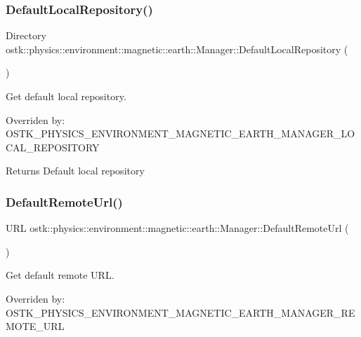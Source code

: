 \subsubsection{\texorpdfstring{Default\+Local\+Repository()}{DefaultLocalRepository()}}
{\footnotesize\ttfamily Directory ostk\+::physics\+::environment\+::magnetic\+::earth\+::\+Manager\+::\+Default\+Local\+Repository (\begin{DoxyParamCaption}{ }\end{DoxyParamCaption})\hspace{0.3cm}{\ttfamily [static]}}



Get default local repository. 

Overriden by\+: O\+S\+T\+K\+\_\+\+P\+H\+Y\+S\+I\+C\+S\+\_\+\+E\+N\+V\+I\+R\+O\+N\+M\+E\+N\+T\+\_\+\+M\+A\+G\+N\+E\+T\+I\+C\+\_\+\+E\+A\+R\+T\+H\+\_\+\+M\+A\+N\+A\+G\+E\+R\+\_\+\+L\+O\+C\+A\+L\+\_\+\+R\+E\+P\+O\+S\+I\+T\+O\+RY

\begin{DoxyReturn}{Returns}
Default local repository 
\end{DoxyReturn}
\mbox{\label{classostk_1_1physics_1_1environment_1_1magnetic_1_1earth_1_1_manager_aedefa57c3b45cd22a7aca9e5b08fe71f}} 
\subsubsection{\texorpdfstring{Default\+Remote\+Url()}{DefaultRemoteUrl()}}
{\footnotesize\ttfamily U\+RL ostk\+::physics\+::environment\+::magnetic\+::earth\+::\+Manager\+::\+Default\+Remote\+Url (\begin{DoxyParamCaption}{ }\end{DoxyParamCaption})\hspace{0.3cm}{\ttfamily [static]}}



Get default remote U\+RL. 

Overriden by\+: O\+S\+T\+K\+\_\+\+P\+H\+Y\+S\+I\+C\+S\+\_\+\+E\+N\+V\+I\+R\+O\+N\+M\+E\+N\+T\+\_\+\+M\+A\+G\+N\+E\+T\+I\+C\+\_\+\+E\+A\+R\+T\+H\+\_\+\+M\+A\+N\+A\+G\+E\+R\+\_\+\+R\+E\+M\+O\+T\+E\+\_\+\+U\+RL

